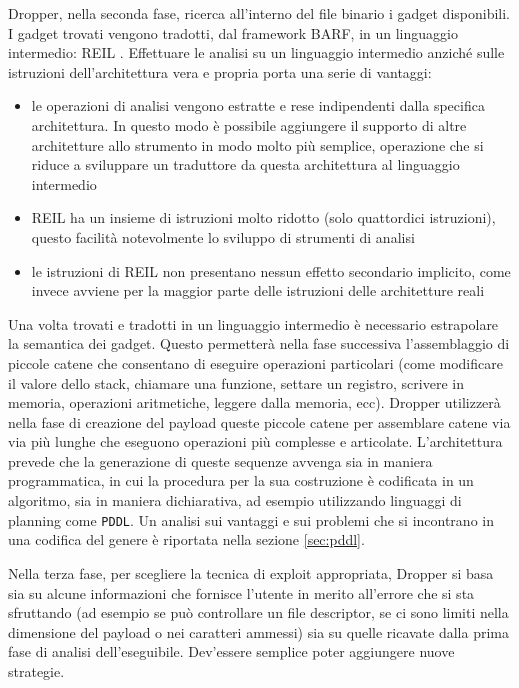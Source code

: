 Dropper, nella seconda fase, ricerca all'interno del file binario i
gadget disponibili. I gadget trovati vengono tradotti, dal framework
BARF, in un linguaggio intermedio: REIL
\cite{dullien-09}. Effettuare le analisi su un linguaggio
intermedio anziché sulle istruzioni dell'architettura vera e propria
porta una serie di vantaggi:

\begin{itemize}
 \item le operazioni di analisi vengono estratte e rese
   indipendenti dalla specifica architettura. In questo modo è
   possibile aggiungere il supporto di altre architetture allo
   strumento in modo molto più semplice, operazione che si riduce a
   sviluppare un traduttore da questa architettura al linguaggio
   intermedio

 \item REIL ha un insieme di istruzioni molto ridotto (solo
   quattordici istruzioni), questo facilità notevolmente lo sviluppo
   di strumenti di analisi

  \item le istruzioni di REIL non presentano nessun effetto
  secondario implicito, come invece avviene per la maggior parte delle
  istruzioni delle architetture reali

\end{itemize}

Una volta trovati e tradotti in un linguaggio intermedio è necessario
estrapolare la semantica dei gadget. Questo permetterà nella fase
successiva l'assemblaggio di piccole catene che consentano di eseguire
operazioni particolari (come modificare il valore dello stack,
chiamare una funzione, settare un registro, scrivere in memoria,
operazioni aritmetiche, leggere dalla memoria, ecc). Dropper
utilizzerà nella fase di creazione del payload queste piccole catene
per assemblare catene via via più lunghe che eseguono operazioni più
complesse e articolate. L'architettura prevede che la generazione di
queste sequenze avvenga sia in maniera programmatica, in cui la
procedura per la sua costruzione è codificata in un algoritmo, sia in
maniera dichiarativa, ad esempio utilizzando linguaggi di planning
come \lstinline{PDDL}\cite{pddl-97}. Un analisi sui vantaggi e sui
problemi che si incontrano in una codifica del genere è riportata
nella sezione \ref{sec:pddl}.

Nella terza fase, per scegliere la tecnica di exploit appropriata,
Dropper si basa sia su alcune informazioni che fornisce l'utente in
merito all'errore che si sta sfruttando (ad esempio se può controllare
un file descriptor, se ci sono limiti nella dimensione del payload o
nei caratteri ammessi) sia su quelle ricavate dalla prima fase di
analisi dell'eseguibile. Dev'essere semplice poter aggiungere nuove
strategie.

